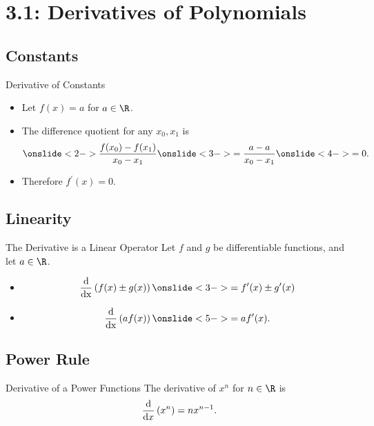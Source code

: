 \documentclass[Lecture.tex]{subfiles}
\begin{document}
\section{3.1: Derivatives of Polynomials}
\subsection{Constants}
\begin{frame}{Derivative of Constants}
  \begin{itemize}
  \item<1->
    Let $f(x) = a$ for $a \in \R$.
  \item<2->
    The difference quotient for any $x_0, x_1$ is
    $$\onslide<2->{\frac{f(x_0) - f(x_1)}{x_0 - x_1}}\onslide<3->{= \frac{a - a }{x_0 - x_1}}\onslide<4->{ = 0.}$$
  \item<5->
    Therefore $f^\prime(x) = 0$.
  \end{itemize}
\end{frame}

\subsection{Linearity}
\begin{frame}{The Derivative is a Linear Operator}
  Let $f$ and $g$ be differentiable functions, and let $a \in \R$.
  \begin{itemize}
  \item<2->
    $$\frac{\operatorname{d}}{\operatorname{dx}}\left(f(x) \pm g(x)\right) \onslide<3->{= f^\prime(x) \pm g^\prime(x)}$$
  \item<4->
    $$\frac{\operatorname{d}}{\operatorname{dx}}\left(af(x)\right) \onslide<5->{= af^\prime(x).}$$
  \end{itemize}
\end{frame}

\subsection{Power Rule}

\begin{frame}{Derivative of a Power Functions}
  The derivative of $x^n$ for $n \in \R$ is 
  $$\frac{\operatorname{d}}{\operatorname{d}\!x}\left(x^n\right) = nx^{n-1}.$$

\end{frame}
\end{document}
